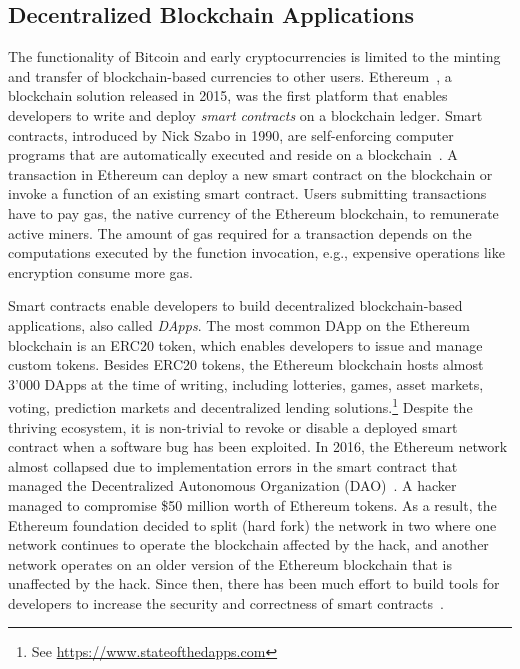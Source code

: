 \subsection{Decentralized Blockchain Applications}
The functionality of Bitcoin and early cryptocurrencies is limited to the minting and transfer of blockchain-based currencies to other users.
Ethereum~\cite{wood2014ethereum}, a blockchain solution released in 2015, was the first platform that enables developers to write and deploy \emph{smart contracts} on a blockchain ledger.
Smart contracts, introduced by Nick Szabo in 1990, are self-enforcing computer programs that are automatically executed and reside on a blockchain~\cite{szabo1996smart}.
A transaction in Ethereum can deploy a new smart contract on the blockchain or invoke a function of an existing smart contract.
Users submitting transactions have to pay gas, the native currency of the Ethereum blockchain, to remunerate active miners.
The amount of gas required for a transaction depends on the computations executed by the function invocation, e.g., expensive operations like encryption consume more gas.


Smart contracts enable developers to build decentralized blockchain-based applications, also called \emph{DApps}.
The most common DApp on the Ethereum blockchain is an ERC20 token, which enables developers to issue and manage custom tokens.
Besides ERC20 tokens, the Ethereum blockchain hosts almost 3'000 DApps at the time of writing, including lotteries, games, asset markets, voting, prediction markets and decentralized lending solutions.\footnote{See \url{https://www.stateofthedapps.com}}
Despite the thriving ecosystem, it is non-trivial to revoke or disable a deployed smart contract when a software bug has been exploited.
In 2016, the Ethereum network almost collapsed due to implementation errors in the smart contract that managed the Decentralized Autonomous Organization (DAO)~\cite{mehar2019understanding}.
A hacker managed to compromise \$50 million worth of Ethereum tokens.
As a result, the Ethereum foundation decided to split (hard fork) the network in two where one network continues to operate the blockchain affected by the hack, and another network operates on an older version of the Ethereum blockchain that is unaffected by the hack.
Since then, there has been much effort to build tools for developers to increase the security and correctness of smart contracts~\cite{breidenbach2018enter}.

